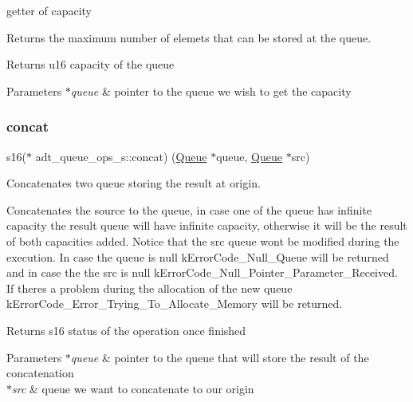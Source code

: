 getter of capacity 

Returns the maximum number of elemets that can be stored at the queue.

\begin{DoxyReturn}{Returns}
u16 capacity of the queue 
\end{DoxyReturn}

\begin{DoxyParams}{Parameters}
{\em $\ast$queue} & pointer to the queue we wish to get the capacity \\
\hline
\end{DoxyParams}
\mbox{\label{structadt__queue__ops__s_ae67763f899a58200c76526cec5bd9802}} 
\subsubsection{\texorpdfstring{concat}{concat}}
{\footnotesize\ttfamily s16($\ast$ adt\+\_\+queue\+\_\+ops\+\_\+s\+::concat) (\hyperlink{structadt__queue__s}{Queue} $\ast$queue, \hyperlink{structadt__queue__s}{Queue} $\ast$src)}



Concatenates two queue storing the result at origin. 

Concatenates the source to the queue, in case one of the queue has infinite capacity the result queue will have infinite capacity, otherwise it will be the result of both capacities added. Notice that the src queue won\textquotesingle{}t be modified during the execution. In case the queue is null k\+Error\+Code\+\_\+\+Null\+\_\+\+Queue will be returned and in case the the src is null k\+Error\+Code\+\_\+\+Null\+\_\+\+Pointer\+\_\+\+Parameter\+\_\+\+Received. If there\textquotesingle{}s a problem during the allocation of the new queue k\+Error\+Code\+\_\+\+Error\+\_\+\+Trying\+\_\+\+To\+\_\+\+Allocate\+\_\+\+Memory will be returned.

\begin{DoxyReturn}{Returns}
s16 status of the operation once finished 
\end{DoxyReturn}

\begin{DoxyParams}{Parameters}
{\em $\ast$queue} & pointer to the queue that will store the result of the concatenation \\
\hline
{\em $\ast$src} & queue we want to concatenate to our origin \\
\hline
\end{DoxyParams}
\mbox{\label{structadt__queue__ops__s_a840fb2130df3abac26f7d8a80d13d2b8}} 
